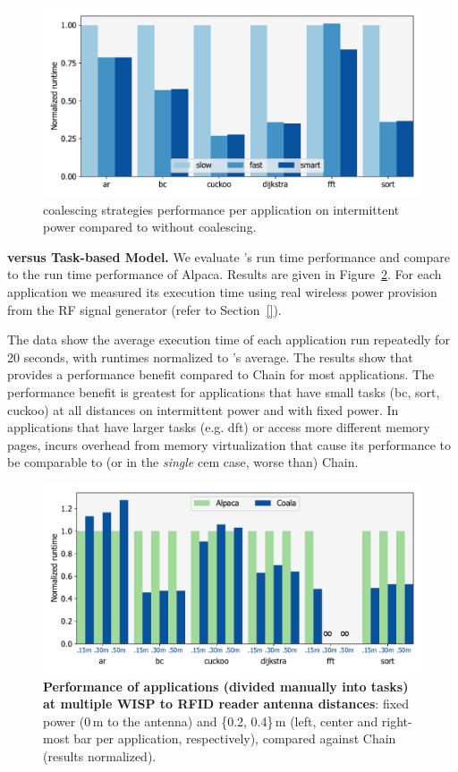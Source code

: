 \begin{figure}
	\centering
	\includegraphics[width=\columnwidth]{figures/coalStrategies}
	\caption{\sys coalescing strategies performance per application on intermittent power compared to \sys without coalescing. }
	\label{fig:coalescing}
\end{figure}

\textbf{\sys versus Task-based Model.} We evaluate \sys's run time performance and compare \sys to the run time performance of Alpaca. Results are given in Figure~\ref{fig:runtime}. For each application we measured its execution time using real wireless power provision from the RF signal generator (refer to Section~\ref{}).

The data show the average execution time of each application run repeatedly for 20 seconds, with runtimes normalized to \sys's average. The results show that \sys provides a performance benefit compared to Chain for most applications. The performance benefit is greatest for applications that have small tasks (bc, sort, cuckoo) at all distances on intermittent power and with fixed power. In applications that have larger tasks (e.g. dft) or access more different memory pages, \sys incurs overhead from memory virtualization that cause its performance to be comparable to (or in the \emph{single} cem case, worse than) Chain. 

\begin{figure}
	\centering
	\includegraphics[width=\columnwidth]{figures/coala_alpaca_gcc}
	\caption{\textbf{Performance of \sys applications (divided manually into tasks) at multiple WISP to RFID reader antenna distances}: fixed power (0\,m to the antenna) and \{0.2, 0.4\}\,m (left, center and right-most bar per application, respectively), compared against Chain (results normalized).}
	\label{fig:runtime}
\end{figure}

